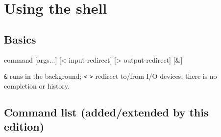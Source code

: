 \documentclass[a4paper,11pt]{article}
\begin{document}
\section{Using the shell}
\subsection{Basics}
\begin{code}
command [args...]    [< input-redirect] [> output-redirect] [&]
\end{code}
\verb|&| runs in the background; \verb|<| \verb|>| redirect to/from I/O devices;
there is no completion or history.

\subsection{Command list (added/extended by this edition)}
\end{document}
